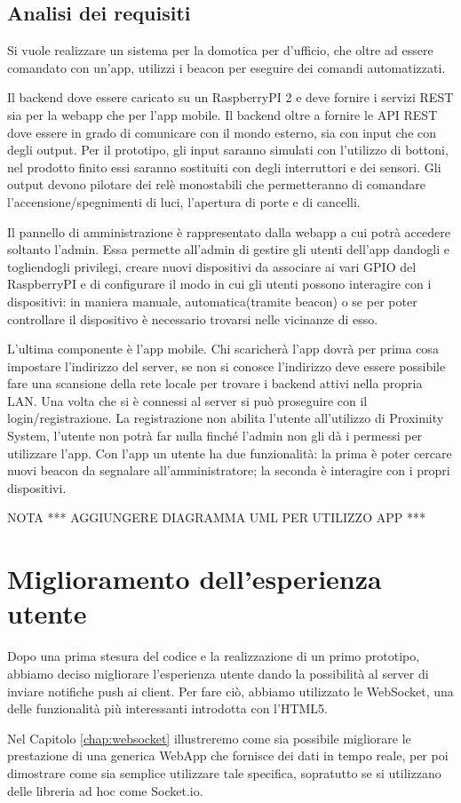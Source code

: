 \subsection{Analisi dei requisiti}
Si vuole realizzare un sistema per la domotica per d'ufficio, che oltre ad essere comandato con un'app, utilizzi i beacon per eseguire dei comandi automatizzati.

Il backend dove essere caricato su un RaspberryPI 2 e deve fornire i servizi REST sia per la webapp che per l'app mobile. 
Il backend oltre a fornire le API REST dove essere in grado di comunicare con il mondo esterno, sia con input che con degli output.
Per il prototipo, gli input saranno simulati con l'utilizzo di bottoni, nel prodotto finito essi saranno sostituiti con degli interruttori e dei sensori.
Gli output devono pilotare dei relè monostabili che permetteranno di comandare l'accensione/spegnimenti di luci, l'apertura di porte e di cancelli.

Il pannello di amministrazione è rappresentato dalla webapp a cui potrà accedere soltanto l'admin. 
Essa permette all'admin di gestire gli utenti dell'app dandogli e togliendogli privilegi, creare nuovi dispositivi da associare ai vari GPIO del RaspberryPI e   di configurare il modo in cui gli utenti possono interagire con i dispositivi: in maniera manuale, automatica(tramite beacon) o se per poter controllare il dispositivo è necessario trovarsi nelle vicinanze di esso. 

L'ultima componente è l'app mobile. 
Chi scaricherà l'app dovrà per prima cosa impostare l'indirizzo del server, se non si conosce l'indirizzo deve essere possibile fare una scansione della rete locale per trovare i backend attivi nella propria LAN. 
Una volta che si è connessi al server si può proseguire con il login/registrazione. La registrazione non abilita l'utente all'utilizzo di Proximity System, l'utente non potrà far nulla finché l'admin non gli dà i permessi per utilizzare l'app. 
Con l'app un utente ha due funzionalità: la prima è poter cercare nuovi beacon da segnalare all'amministratore; la seconda è interagire con i propri dispositivi.

{\Huge NOTA *** AGGIUNGERE DIAGRAMMA UML PER UTILIZZO APP ***}

\section{Miglioramento dell'esperienza utente}
Dopo una prima stesura del codice e la realizzazione di un primo prototipo,
abbiamo deciso migliorare l'esperienza utente dando la possibilità al server di inviare notifiche push ai client.
Per fare ciò, abbiamo utilizzato le WebSocket, una delle funzionalità più interessanti introdotta con l'HTML5.

Nel Capitolo \ref{chap:websocket} illustreremo come sia possibile migliorare le  prestazione di una generica WebApp che fornisce dei dati in tempo reale, per poi dimostrare come sia semplice utilizzare tale specifica, sopratutto se si utilizzano delle libreria ad hoc come Socket.io. 
